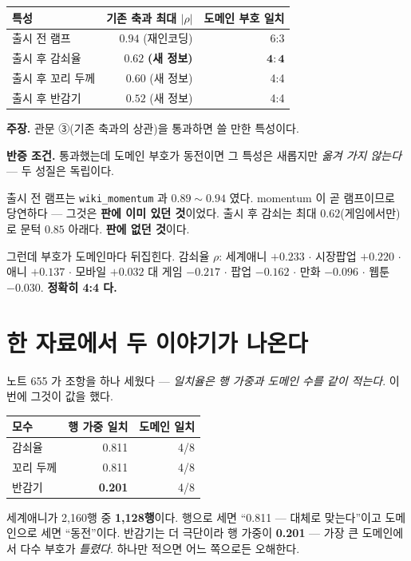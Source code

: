 \documentclass[10pt,a4paper]{article}
\newcommand{\claim}[2]{\begin{claimbox}\textbf{주장.} #1\par\smallskip
  \textcolor{gray!70}{\textbf{반증 조건.} #2}\end{claimbox}}
\begin{document}
\begin{center}\small
\begin{tabular}{lrr}\toprule
특성 & 기존 축과 최대 $|\rho|$ & 도메인 부호 일치 \\ \midrule
출시 전 램프 & $\mathbf{0.94}$ (재인코딩) & 6:3 \\
출시 후 감쇠율 & $0.62$ \textbf{(새 정보)} & $\mathbf{4:4}$ \\
출시 후 꼬리 두께 & $0.60$ (새 정보) & 4:4 \\
출시 후 반감기 & $0.52$ (새 정보) & 4:4 \\ \bottomrule
\end{tabular}\end{center}

\claim{관문 ③(기존 축과의 상관)을 통과하면 쓸 만한 특성이다.}{통과했는데 도메인
부호가 동전이면 그 특성은 새롭지만 \emph{옮겨 가지 않는다} --- 두 성질은 독립이다.}

출시 전 램프는 \verb|wiki_momentum| 과 $0.89\sim0.94$ 였다. momentum 이 곧
램프이므로 당연하다 --- 그것은 \textbf{판에 이미 있던 것}이었다. 출시 후 감쇠는
최대 $0.62$(게임에서만)로 문턱 $0.85$ 아래다. \textbf{판에 없던 것}이다.

그런데 부호가 도메인마다 뒤집힌다. 감쇠율 $\rho$: 세계애니 $+0.233$ $\cdot$
시장팝업 $+0.220$ $\cdot$ 애니 $+0.137$ $\cdot$ 모바일 $+0.032$ 대
게임 $\mathbf{-0.217}$ $\cdot$ 팝업 $-0.162$ $\cdot$ 만화 $-0.096$ $\cdot$
웹툰 $-0.030$. \textbf{정확히 4:4 다.}

\section{한 자료에서 두 이야기가 나온다}

노트 655 가 조항을 하나 세웠다 --- \emph{일치율은 행 가중과 도메인 수를 같이
적는다}. 이번에 그것이 값을 했다.

\begin{center}\small
\begin{tabular}{lrr}\toprule
모수 & 행 가중 일치 & 도메인 일치 \\ \midrule
감쇠율 & 0.811 & 4/8 \\
꼬리 두께 & 0.811 & 4/8 \\
반감기 & \textbf{0.201} & 4/8 \\ \bottomrule
\end{tabular}\end{center}

세계애니가 2,160행 중 \textbf{1,128행}이다. 행으로 세면 ``0.811 --- 대체로
맞는다''이고 도메인으로 세면 ``동전''이다. 반감기는 더 극단이라 행 가중이
\textbf{0.201} --- 가장 큰 도메인에서 다수 부호가 \emph{틀렸다}. 하나만 적으면
어느 쪽으로든 오해한다.
\end{document}

